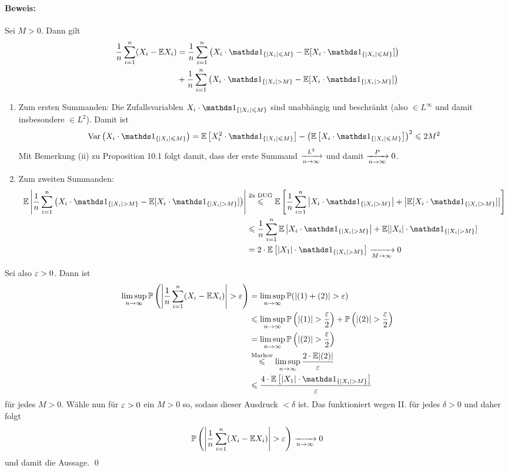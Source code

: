 \paragraph{Beweis:} Sei $M>0$. Dann gilt
\begin{align*}
    \dfrac{1}{n}\sum_{i=1}^n(X_i-\E X_i)
    &=\dfrac{1}{n}\sum_{i=1}^n\left(X_i\cdot\ind{\{|X_i|\leq M\}}-\E [X_i\cdot\ind{\{|X_i|\leq M\}}]\right)\\
    &+\dfrac{1}{n}\sum_{i=1}^n\left(X_i\cdot\ind{\{|X_i|> M\}}-\E[ X_i\cdot\ind{\{|X_i|> M\}}]\right)
\end{align*}
\begin{enumerate}[label=\Roman*.]
    \item Zum ersten Summanden: \newline
    Die Zufallsvariablen $X_i\cdot\ind{\{|X_i|\leq M\}}$ sind unabh\"angig und beschr\"ankt (also $\in L^\infty$ und damit insbesondere $\in L^2$). Damit ist
    $$\Var\left(X_i\cdot\ind{\{|X_i|\leq M\}}\right)=\E\left[X_i^2\cdot\ind{\{|X_i|\leq M\}}\right]-\left(\E\left[X_i\cdot\ind{\{|X_i|\leq M\}}\right]\right)^2\leq 2M^2$$
    Mit Bemerkung (ii) zu Proposition 10.1 folgt damit, dass der erste Summand $\nto{L^2}{n\to\infty}$ und damit $\nto{P}{n\to\infty}0$.
    \item Zum zweiten Summanden:\newline
    \begin{align*}
        \E\left|\dfrac{1}{n}\sum_{i=1}^n\left(X_i\cdot\ind{\{|X_i|> M\}}-\E[ X_i\cdot\ind{\{|X_i|> M\}}]\right)\right|
        &\overset{\text{2x DUG}}{\leq}
        \E\left[\dfrac{1}{n}\sum_{i=1}^n\left|X_i\cdot\ind{\{|X_i|> M\}}\right|+\left|\E[ X_i\cdot\ind{\{|X_i|> M\}}]\right|\right]\\
        &\leq\dfrac{1}{n}\sum_{i=1}^n\E\left|X_i\cdot\ind{\{|X_i|>M\}}\right|+\E[ |X_i|\cdot\ind{\{|X_i|> M\}}]\\
        &=2\cdot\E\left[|X_1|\cdot\ind{\{|X_i|>M\}}\right]\nto{}{M\to\infty}0
    \end{align*}
\end{enumerate}
Sei also $\varepsilon>0$. Dann ist
\begin{align*}
    \limsup_{n\to\infty}\Pp\left(\left|\dfrac{1}{n}\sum_{i=1}^n(X_i-\E X_i)\right|>\eps\right)&=\limsup_{n\to\infty}\Pp(|(1)+(2)|>\eps)\\
    &\leq\limsup_{n\to\infty}\Pp\left(|(1)|>\dfrac{\eps}{2}\right)+\Pp\left(|(2)|>\dfrac{\eps}{2}\right)\\
    &=\limsup_{n\to\infty}\Pp\left(|(2)|>\dfrac{\eps}{2}\right)\\
    &\overset{\text{Markov}}{\leq}\limsup_{n\to\infty}\dfrac{2\cdot\E|(2)|}{\eps}\\
    &\leq\dfrac{4\cdot\E\left[|X_1|\cdot\ind{\{|X_i|>M\}}\right]}{\eps}
\end{align*}
f\"ur jedes $M>0$. W\"ahle nun f\"ur $\varepsilon>0$ ein $M>0$ so, sodass dieser Ausdruck $<\delta$ ist. Das funktioniert wegen II. f\"ur jedes $\delta>0$ und daher folgt 
$$\Pp\left(\left|\dfrac{1}{n}\sum_{i=1}^n(X_i-\E X_i)\right|>\eps\right)\nto{}{n\to\infty}0$$
und damit die Aussage. \qed

